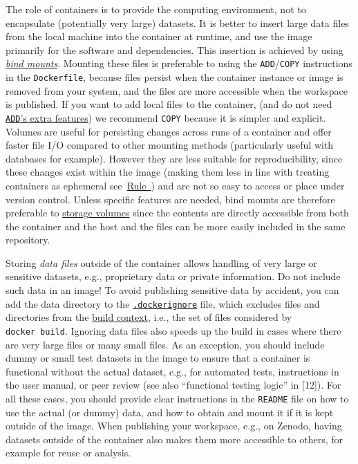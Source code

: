 \documentclass[10pt,letterpaper]{article}
\begin{document}
The role of containers is to provide the computing environment, not to
encapsulate (potentially very large) datasets. It is better to insert
large data files from the local machine into the container at runtime,
and use the image primarily for the software and dependencies. This
insertion is achieved by using
\href{https://docs.docker.com/storage/bind-mounts/}{\emph{bind mounts}}.
Mounting these files is preferable to using the
\texttt{ADD}/\texttt{COPY} instructions in the \texttt{Dockerfile},
because files persist when the container instance or image is removed
from your system, and the files are more accessible when the workspace
is published. If you want to add local files to the container, (and do
not need
\href{https://docs.docker.com/engine/reference/builder/\#add}{\texttt{ADD}'s
extra features}) we recommend \texttt{COPY} because it is simpler and
explicit. Volumes are useful for persisting changes across runs of a
container and offer faster file I/O compared to other mounting methods
(particularly useful with databases for example). However they are less
suitable for reproducibility, since these changes exist within the image
(making them less in line with treating containers as ephemeral
see~\hyperref[{rule:usage}]{Rule~}) and are not so
easy to access or place under version control. Unless specific features
are needed, bind mounts are therefore preferable to
\href{https://docs.docker.com/storage/volumes/}{storage volumes} since
the contents are directly accessible from both the container and the
host and the files can be more easily included in the same repository.

Storing \emph{data files} outside of the container allows handling of
very large or sensitive datasets, e.g., proprietary data or private
information. Do not include such data in an image! To avoid publishing
sensitive data by accident, you can add the data directory to the
\href{https://docs.docker.com/engine/reference/commandline/build/\#use-a-dockerignore-file}{\texttt{.dockerignore}}
file, which excludes files and directories from the
\href{https://docs.docker.com/engine/reference/commandline/build/\#extended-description}{build
context}, i.e., the set of files considered by \texttt{docker\ build}.
Ignoring data files also speeds up the build in cases where there are
very large files or many small files. As an exception, you should
include dummy or small test datasets in the image to ensure that a
container is functional without the actual dataset, e.g., for automated
tests, instructions in the user manual, or peer review (see also
``functional testing logic'' in {[}12{]}). For all these cases, you
should provide clear instructions in the \texttt{README} file on how to
use the actual (or dummy) data, and how to obtain and mount it if it is
kept outside of the image. When publishing your workspace, e.g., on
Zenodo, having datasets outside of the container also makes them more
accessible to others, for example for reuse or analysis.
\end{document}
